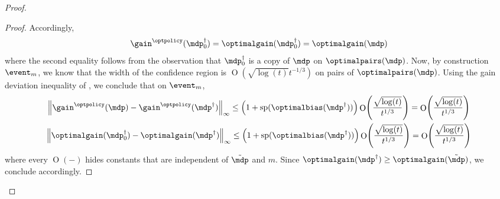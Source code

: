 \documentclass[preprint,cleveref,12pt]{colt2025}
\DeclarePairedDelimiter{\parens}{(}{)}	%
\DeclarePairedDelimiter{\norm}{\lVert}{\rVert}	%
\newcommand{\vecspan}[1]{\mathrm{sp}\parens{#1}}
\DeclareMathOperator*{\OH}{\mathrm{O}}
\def\model{\mdp}
\def\optpairs{\optimalpairs}
\def\optgain{\optimalgain} %
\def\optbias{\optimalbias} %
\begin{document}
\begin{proof}
\begin{proof}
            Accordingly,
            \begin{equation}
                \gain^{\optpolicy}(\model^\dagger_0) 
                = \optgain(\model^\dagger_0)
                = \optgain(\model)
            \end{equation}
            where the second equality follows from the observation that $\model^\dagger_0$ is a copy of $\model$ on $\optpairs(\model)$. 
            Now, by construction $\event_m$, we know that the width of the confidence region is $\OH(\sqrt{\log(t)} t^{-1/3})$ on pairs of $\optpairs(\model)$. 
            Using the gain deviation inequality of , we conclude that on $\event_m$, 
            \begin{equation}
            \begin{gathered}
                \norm*{
                    \gain^{\optpolicy}(\model)
                    -
                    \gain^{\optpolicy}(\model^\dagger)
                }_\infty
                \le
                \parens*{1 + \vecspan{\optbias(\model^\dagger)}}
                \OH \parens*{
                    \frac{\sqrt{\log(t)}}{t^{1/3}}
                }
                =
                \OH \parens*{
                    \frac{\sqrt{\log(t)}}{t^{1/3}}
                }
                \\
                \norm*{
                    \optgain(\model^\dagger_0)
                    -
                    \optgain(\model^\dagger)
                }_\infty
                \le
                \parens*{1 + \vecspan{\optbias(\model^\dagger)}}
                \OH \parens*{
                    \frac{\sqrt{\log(t)}}{t^{1/3}}
                }
                =
                \OH \parens*{
                    \frac{\sqrt{\log(t)}}{t^{1/3}}
                }
            \end{gathered}
            \end{equation}
            where every $\OH(-)$ hides constants that are independent of $\tilde{\model}$ and $m$. 
            Since $\optgain(\model^\dagger) \ge \optgain(\tilde{\model})$, we conclude accordingly. 
        \end{proof}


\end{proof}
\end{document}
